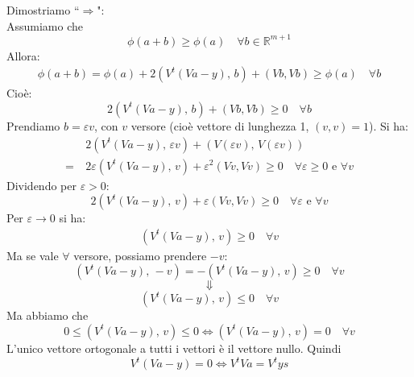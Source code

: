 Dimostriamo ``$\Rightarrow$": \\
Assumiamo che
\[
\phi(a+b) \geq \phi(a) \quad \forall b \in \mathbb{R}^{m+1}
\]
Allora:
\[ \begin{split}
\phi(a+b)=\phi(a)+2(V^t(Va-y), \, b)+(Vb,Vb) \geq \phi(a) \quad \forall b
\end{split} \]
Cioè:
\[
2(V^t(Va-y), \, b) + (Vb,Vb) \geq 0 \quad \forall b
\]
Prendiamo $b=\varepsilon v$, con $v$ versore (cioè vettore di lunghezza 1, $(v,v)=1$). Si ha:
\[ \begin{split}
& 2(V^t(Va-y), \, \varepsilon v)+(V(\varepsilon v), \, V(\varepsilon v)) \\
 = \ & 2\varepsilon (V^t(Va-y), \, v) + \varepsilon^2(Vv,Vv) \geq 0 \quad \forall \varepsilon \geq 0 \text{ e } \forall v
\end{split} \]
Dividendo per $\varepsilon > 0$:
\[ 
2(V^t(Va-y), \, v) + \varepsilon(Vv,Vv) \geq 0 \quad \forall \varepsilon \text{ e } \forall v
\]
Per $\varepsilon \to 0$ si ha:
\[ \begin{split}
(V^t(Va-y), \, v) \geq 0 \quad \forall v
\end{split} \]
Ma se vale $\forall$ versore, possiamo prendere $-v$:
\[ (V^t(Va-y), \, -v)=-(V^t(Va-y), \, v) \geq 0 \quad \forall v\]
\[ \Downarrow\]
\[
(V^t(Va-y), \, v)\le0 \quad \forall v
\]
Ma abbiamo che
\[
0\le (V^t(Va-y), \, v)\le0 \iff (V^t(Va-y), \, v) = 0 \quad \forall v
 \]
L'unico vettore ortogonale a tutti i vettori è il vettore nullo. Quindi
\[
V^t(Va-y)=0 \iff V^tVa=V^ty
s\]